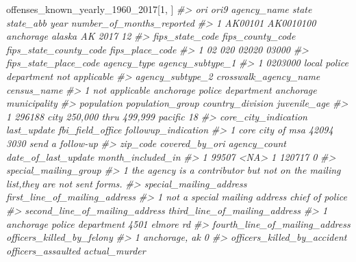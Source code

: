 \documentclass[
  12pt,
]{book}
\newenvironment{Shaded}{\begin{snugshade}}{\end{snugshade}}
\newcommand{\CommentTok}[1]{\textcolor[rgb]{0.37,0.37,0.37}{\textit{#1}}}
\newcommand{\DecValTok}[1]{\textcolor[rgb]{0.06,0.06,0.06}{#1}}
\newcommand{\NormalTok}[1]{#1}
\begin{document}
\begin{Shaded}
\begin{Highlighting}[]
\NormalTok{offenses\_known\_yearly\_}\DecValTok{1960}\NormalTok{\_}\DecValTok{2017}\NormalTok{[}\DecValTok{1}\NormalTok{, ]}
\CommentTok{\#\textgreater{}       ori      ori9 agency\_name  state state\_abb year number\_of\_months\_reported}
\CommentTok{\#\textgreater{} 1 AK00101 AK0010100   anchorage alaska        AK 2017                        12}
\CommentTok{\#\textgreater{}   fips\_state\_code fips\_county\_code fips\_state\_county\_code fips\_place\_code}
\CommentTok{\#\textgreater{} 1              02              020                  02020           03000}
\CommentTok{\#\textgreater{}   fips\_state\_place\_code             agency\_type agency\_subtype\_1}
\CommentTok{\#\textgreater{} 1               0203000 local police department   not applicable}
\CommentTok{\#\textgreater{}   agency\_subtype\_2       crosswalk\_agency\_name            census\_name}
\CommentTok{\#\textgreater{} 1   not applicable anchorage police department anchorage municipality}
\CommentTok{\#\textgreater{}   population          population\_group country\_division juvenile\_age}
\CommentTok{\#\textgreater{} 1     296188 city 250,000 thru 499,999          pacific           18}
\CommentTok{\#\textgreater{}   core\_city\_indication last\_update fbi\_field\_office followup\_indication}
\CommentTok{\#\textgreater{} 1     core city of msa       42094             3030    send a follow{-}up}
\CommentTok{\#\textgreater{}   zip\_code covered\_by\_ori agency\_count date\_of\_last\_update month\_included\_in}
\CommentTok{\#\textgreater{} 1    99507           \textless{}NA\textgreater{}            1              120717                 0}
\CommentTok{\#\textgreater{}                                                              special\_mailing\_group}
\CommentTok{\#\textgreater{} 1 the agency is a contributor but not on the mailing list,they are not sent forms.}
\CommentTok{\#\textgreater{}         special\_mailing\_address first\_line\_of\_mailing\_address}
\CommentTok{\#\textgreater{} 1 not a special mailing address               chief of police}
\CommentTok{\#\textgreater{}   second\_line\_of\_mailing\_address third\_line\_of\_mailing\_address}
\CommentTok{\#\textgreater{} 1    anchorage police department                4501 elmore rd}
\CommentTok{\#\textgreater{}   fourth\_line\_of\_mailing\_address officers\_killed\_by\_felony}
\CommentTok{\#\textgreater{} 1                  anchorage, ak                         0}
\CommentTok{\#\textgreater{}   officers\_killed\_by\_accident officers\_assaulted actual\_murder}

\end{Highlighting}
\end{Shaded}
\end{document}
